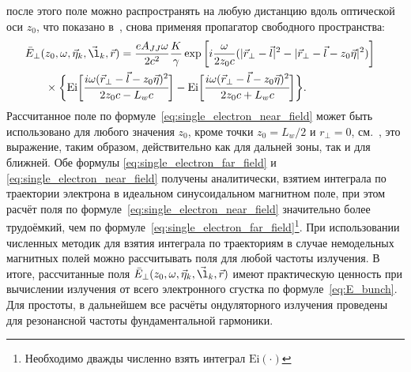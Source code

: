 после этого поле можно распространять на любую дистанцию вдоль оптической оси $z_0$, что показано в~\cite{geloni_fourier_2007}, снова применяя пропагатор свободного пространства:
\begin{align}
	\bar{E}_{\bot}(&z_0, \omega, \vec{\eta}_k, \vec{\l}_k, \vec{r}) =
		\frac{e A_{JJ} \omega}{2 c^2}\frac{K}{\gamma} \exp{\bigg[i \frac{\omega}{2 z_0 c} (|\vec{r}_{\bot} - \vec{l}|^2 - |\vec{r}_{\bot} - \vec{l} - z_0 \vec{\eta}|^2) \bigg]} \cr & \times	\bigg \{ \text{Ei} \bigg[ \cfrac{i \omega (\vec{r}_{\bot} - \vec{l} - z_0 \vec{\eta})^2}{2z_0c - L_w c}\bigg] - \text{Ei} \bigg[ \cfrac{i \omega (\vec{r}_{\bot} - \vec{l} - z_0 \vec{\eta})^2}{2z_0c + L_w c} \bigg] \bigg\}.
	\label{eq:single_electron_near_field}
\end{align}
Рассчитанное поле по формуле~\ref{eq:single_electron_near_field} может быть использовано для любого значения $z_0$, кроме точки $z_0 = L_w/2$ и $r_{\bot} = 0$, см.~\cite{geloni_fourier_2007}, это выражение, таким образом, действительно как для дальней зоны, так и для ближней. Обе формулы \ref{eq:single_electron_far_field} и \ref{eq:single_electron_near_field} получены аналитически, взятием интеграла по траектории электрона в идеальном синусоидальном магнитном поле, при этом расчёт поля по формуле~\ref{eq:single_electron_near_field} значительно более трудоёмкий, чем по формуле~\ref{eq:single_electron_far_field}\footnote{Необходимо дважды численно взять интеграл $\text{Ei}(\cdot)$}. При использовании численных методик для взятия интеграла по траекториям в случае немодельных магнитных полей можно рассчитывать поля для любой частоты излучения. В итоге, рассчитанные поля $\bar{E}_{\bot}(z_0, \omega, \vec{\eta}_k, \vec{\l}_k, \vec{r})$ имеют практическую ценность при вычислении излучения от всего электронного сгустка по формуле~\ref{eq:E_bunch}. Для простоты, в дальнейшем все расчёты ондуляторного излучения проведены для резонансной частоты фундаментальной гармоники.
 
